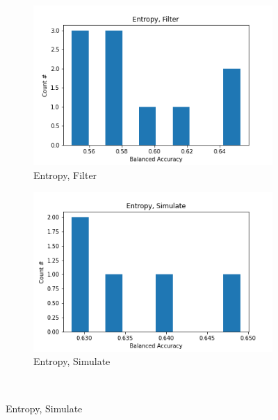 \documentclass{article}
\begin{document}
\begin{figure}[H]
    \begin{subfigure}[t]{.45\linewidth}
    \centering\includegraphics[width=1\linewidth]{Fig/Entropy, Filter.png}
    \caption{Entropy, Filter}
  \end{subfigure}
  \begin{subfigure}[t]{.45\linewidth}
    \centering\includegraphics[width=1\linewidth]{Fig/Entropy, Simulate.png}
    \caption{Entropy, Simulate}
  \end{subfigure}\\


\end{figure}
\end{document}
